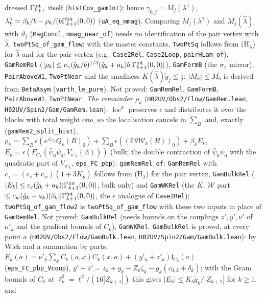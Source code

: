 \documentclass[11pt]{amsart}
\theoremstyle{definition}
\theoremstyle{remark}
\numberwithin{equation}{section}
\begin{document}
dressed $\Gamma^{\rm int}_{k+1}$ itself (\texttt{histCov\_gamInt}); hence $\gamma_{0,j}=M_j(\lambda^\gamma)$, $\lambda^\gamma_k=\beta_k/b-\rho_k/(b\Gamma^{\rm int}_{k+1}(0,0))$
(\texttt{uA\_eq\_mmag}). Comparing $M_j(\lambda^\gamma)$ and $M_j(\hat\lambda)$ with $\vartheta_j$ (\texttt{MagConcl}, \texttt{mmag\_near\_of}) needs no identification of the
pair vertex with $\hat\lambda$. \texttt{twoPtSq\_of\_gam\_flow}: with the master constants, \texttt{TwoPtSq} follows from (H$_\lambda$) for $\hat\lambda$ and for the
pair vertex (e.g.\ \texttt{Case2Rel}, \texttt{Case2Loop}, \texttt{pairHLam\_of}), \texttt{GamRemRel} ($|\rho_k|\le c_\gamma(\check g_k/b)^{1/3}(\check g_k+a_k)b|\Gamma^{\rm int}_{k+1}(0,0)|$),
\texttt{GamFormB} (the $\sigma_x$ mirror), \texttt{PairAboveW1}, \texttt{TwoPtNear} and the smallness $K(\hat\lambda)\check g_j\le\frac12$; $|M_k|\le M_b$ is derived from
\texttt{BetaAsym} (\texttt{varth\_le\_pure}). Not proved: \texttt{GamRemRel}, \texttt{GamFormB}, \texttt{PairAboveW1}, \texttt{TwoPtNear}.
\emph{The remainder $\rho_k$} (\texttt{H02UV/Obs2/Flow/GamRem.lean}, \texttt{H02UV/Spin2/Gam/GamRem.lean}). $\operatorname{loc}^a$ preserves $\epsilon$ and distributes it over the
blocks with total weight one, so the localisation cancels in $\sum_B$ and, exactly (\texttt{gamRem2\_split\_hist}),
$\rho_k=\sum_B\epsilon(e^{\mathcal L_{C_k}}Q_k(B)_0)+\sum_B\epsilon((\mathbb E\theta\mathcal W_k(B))_0)+\beta_kE_k$,
$E_k=\epsilon(F_{C_k}(\bar\psi_0\psi_0,V_{\kappa'_k}(\Lambda)))$ (bulk; the double contraction of $\bar\psi_0\psi_0$ with the quadratic part of $V_{\kappa'_k}$,
\texttt{eps\_FC\_pbp}). \texttt{gamRemRel\_of}: \texttt{GamRemRel} with $c_\gamma=(c_e+c_w)(1+3K_p)$ follows from (H$_\lambda$) for the pair vertex,
\texttt{GamBulkRel} ($|E_k|\le c_e(\check g_k+a_k)|\Gamma^{\rm int}_{k+1}(0,0)|$, bulk only) and \texttt{GamWKRel} (the $K$, $\mathcal W$ part
$\le c_w(\check g_k+a_k)|\beta_k||\Gamma^{\rm int}_{k+1}(0,0)|$, the $\epsilon$ analogue of \texttt{Case2Rel}); \texttt{twoPtSq\_of\_gam\_flow2} is
\texttt{twoPtSq\_of\_gam\_flow} with these two inputs in place of \texttt{GamRemRel}. Not proved: \texttt{GamBulkRel} (needs bounds on the couplings
$z',y',\nu'$ of $\kappa'_k$ and the gradient bounds of $C_k$), \texttt{GamWKRel}.
\texttt{GamBulkRel} is proved, at every point $a$ (\texttt{H02UV/Obs2/Flow/GamBulk.lean}, \texttt{H02UV/Spin2/Gam/GamBulk.lean}): by Wick and a summation by parts,
$E_k(a)=\nu'_k\sum_xC_k(a,x)C_k(x,a)+(y'_k+z'_k)\mathfrak l_{C_k}(a)$ (\texttt{eps\_FC\_pbp\_Vcoup}), $y'+z'=z_k+y_k-Z_k\zeta_k-g_k(c_{0,k}+\delta_k)$;
with the Gram bounds of $C_k$ at $\ell_k^2=\ell^2/(16|Z_{k+1}|)$ this gives $|E_k|\le K_b\check g_k/|Z_{k+1}|$ for $k\ge1$, and
\end{document}
